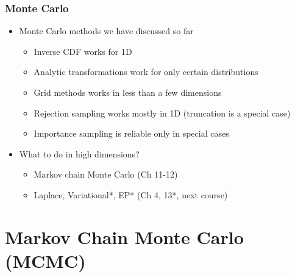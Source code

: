 \documentclass[10pt]{beamer}
\begin{document}
\begin{frame}

\frametitle{ Monte Carlo}

  \begin{itemize}
  \item Monte Carlo methods we have discussed so far
    \begin{itemize}
    \item Inverse CDF works for 1D \pause
    \item Analytic transformations work for only certain distributions \pause
    \item Grid methods works in less than a few dimensions \pause
    \item Rejection sampling works mostly in 1D (truncation is a special case) \pause
    \item Importance sampling is reliable only in special cases
    \end{itemize}
    \pause
  \item What to do in high dimensions? \pause
    \begin{itemize}
    \item Markov chain Monte Carlo (Ch 11-12) \pause
    \item Laplace, Variational*, EP* (Ch 4, 13*, next course)
    \end{itemize}
  \end{itemize}
\end{frame}


\section{Markov Chain Monte Carlo (MCMC)}
\end{document}
